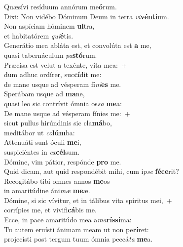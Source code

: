 \evenverse Quæsívi resíduum annórum me\textbf{ó}rum.~\*\\
\evenverse Dixi: Non vidébo Dóminum Deum in terra \textit{vi}\textbf{vén}\textbf{ti}um.\\
\oddverse Non aspíciam hóminem \textbf{ul}tra,~\*\\
\oddverse et habitatórem \textit{qui}\textbf{é}tis.\\
\evenverse Generátio mea abláta est, et convolúta est \textbf{a} me,~\*\\
\evenverse quasi tabernáculum \textit{pa}\textbf{stó}rum.\\
\oddverse Præcísa est velut a texénte, vita mea:~+\\
\oddverse  dum adhuc ordírer, suc\textbf{cí}dit me:~\*\\
\oddverse de mane usque ad vésperam fí\textit{ni}\textbf{es} me.\\
\evenverse Sperábam usque ad \textbf{ma}ne,~\*\\
\evenverse quasi leo sic contrívit ómnia os\textit{sa} \textbf{me}a:\\
\oddverse De mane usque ad vésperam fínies me:~+\\
\oddverse  sicut pullus hirúndinis sic cla\textbf{má}bo,~\*\\
\oddverse meditábor ut \textit{co}\textbf{lúm}ba:\\
\evenverse Attenuáti sunt óculi \textbf{me}i,~\*\\
\evenverse suspiciéntes in \textit{ex}\textbf{cél}sum.\\
\oddverse Dómine, vim pátior, respónde \textbf{pro} me.~\*\\
\oddverse Quid dicam, aut quid respondébit mihi, cum i\textit{pse} \textbf{fé}\textbf{ce}rit?\\
\evenverse Recogitábo tibi omnes annos \textbf{me}os~\*\\
\evenverse in amaritúdine áni\textit{mæ} \textbf{me}æ.\\
\oddverse Dómine, si sic vívitur, et in tálibus vita spíritus mei,~+\\
\oddverse  corrípies me, et vivifi\textbf{cá}bis me.~\*\\
\oddverse Ecce, in pace amaritúdo mea a\textit{ma}\textbf{rís}\textbf{si}ma:\\
\evenverse Tu autem eruísti ánimam meam ut non pe\textbf{rí}ret:~\*\\
\evenverse projecísti post tergum tuum ómnia peccá\textit{ta} \textbf{me}a.\\
